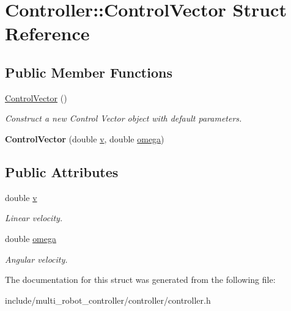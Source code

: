 \hypertarget{structController_1_1ControlVector}{}\section{Controller\+:\+:Control\+Vector Struct Reference}
\label{structController_1_1ControlVector}
\subsection*{Public Member Functions}
\begin{DoxyCompactItemize}
\item 
\mbox{\label{structController_1_1ControlVector_abf98db4ce95ac636bb5ac950b6b820b3}} 
\hyperlink{structController_1_1ControlVector_abf98db4ce95ac636bb5ac950b6b820b3}{Control\+Vector} ()
\begin{DoxyCompactList}\small\item\em Construct a new Control Vector object with default parameters. \end{DoxyCompactList}\item 
\mbox{\label{structController_1_1ControlVector_a547dd5c56a7be54acb7c44f7fdf52c57}} 
{\bfseries Control\+Vector} (double \hyperlink{structController_1_1ControlVector_af8d8ff93ddf343a13a35bba355d39976}{v}, double \hyperlink{structController_1_1ControlVector_ad5963169c4ea0c021cb923191aef7ed3}{omega})
\end{DoxyCompactItemize}
\subsection*{Public Attributes}
\begin{DoxyCompactItemize}
\item 
\mbox{\label{structController_1_1ControlVector_af8d8ff93ddf343a13a35bba355d39976}} 
double \hyperlink{structController_1_1ControlVector_af8d8ff93ddf343a13a35bba355d39976}{v}
\begin{DoxyCompactList}\small\item\em Linear velocity. \end{DoxyCompactList}\item 
\mbox{\label{structController_1_1ControlVector_ad5963169c4ea0c021cb923191aef7ed3}} 
double \hyperlink{structController_1_1ControlVector_ad5963169c4ea0c021cb923191aef7ed3}{omega}
\begin{DoxyCompactList}\small\item\em Angular velocity. \end{DoxyCompactList}\end{DoxyCompactItemize}


The documentation for this struct was generated from the following file\+:\begin{DoxyCompactItemize}
\item 
include/multi\+\_\+robot\+\_\+controller/controller/controller.\+h\end{DoxyCompactItemize}
